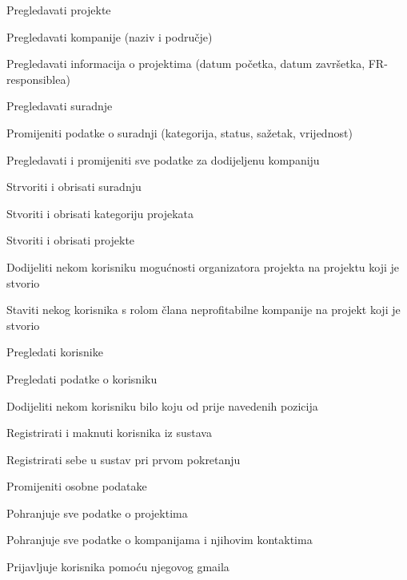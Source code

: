 \begin{packed_enum}
\begin{packed_enum}
				\end{packed_enum}

				\item  {}

				\begin{packed_enum}

					\item Pregledavati projekte
					\item Pregledavati kompanije (naziv i područje)
					\item Pregledavati informacija o projektima (datum početka, datum završetka, FR- responsiblea)
					\item Pregledavati suradnje
					\item Promijeniti podatke o suradnji (kategorija, status, sažetak, vrijednost)
					\item Pregledavati i promijeniti sve podatke za dodijeljenu kompaniju
					\item Strvoriti i obrisati suradnju
					\item Stvoriti i obrisati kategoriju projekata
					\item Stvoriti i obrisati projekte
					\item Dodijeliti nekom korisniku mogućnosti organizatora projekta na projektu koji je stvorio
					\item Staviti nekog korisnika s rolom člana neprofitabilne kompanije na projekt koji je stvorio
					\item Pregledati korisnike
					\item Pregledati podatke o korisniku
					\item Dodijeliti nekom korisniku bilo koju od prije navedenih pozicija
					\item Registrirati i maknuti korisnika iz sustava
					\item Registrirati sebe u sustav pri prvom pokretanju
					\item Promijeniti osobne podatake

				\end{packed_enum}
			
				\item  {}
				
				\begin{packed_enum}
					
					\item Pohranjuje sve podatke o projektima
					\item Pohranjuje sve podatke o kompanijama i njihovim kontaktima
					
				\end{packed_enum}

				\item  {}

				\begin{packed_enum}

					\item Prijavljuje korisnika pomoću njegovog gmaila

				\end{packed_enum}
			\end{packed_enum}
			

